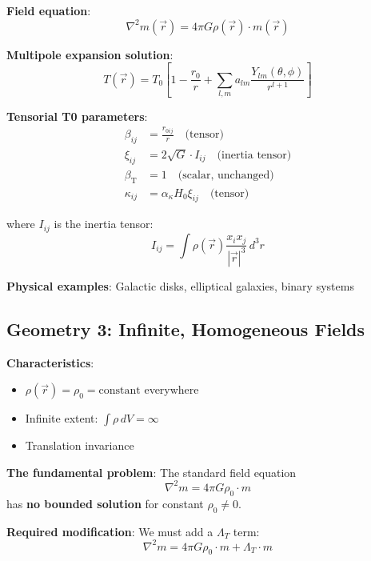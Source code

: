 \documentclass[12pt,a4paper]{article}
\newcommand{\betaT}{\beta_{\text{T}}}
\begin{document}
	\textbf{Field equation}:
	\begin{equation}
		\nabla^2 m(\vec{r}) = 4\pi G \rho(\vec{r}) \cdot m(\vec{r})
	\end{equation}
	
	\textbf{Multipole expansion solution}:
	\begin{equation}
		T(\vec{r}) = T_0\left[1 - \frac{r_0}{r} + \sum_{l,m} a_{lm} \frac{Y_{lm}(\theta,\phi)}{r^{l+1}}\right]
	\end{equation}
	
	\textbf{Tensorial T0 parameters}:
	\begin{align}
		\beta_{ij} &= \frac{r_{0ij}}{r} \quad \text{(tensor)} \\
		\xi_{ij} &= 2\sqrt{G} \cdot I_{ij} \quad \text{(inertia tensor)} \\
		\betaT &= 1 \quad \text{(scalar, unchanged)} \\
		\kappa_{ij} &= \alpha_\kappa H_0 \xi_{ij} \quad \text{(tensor)}
	\end{align}
	
	where $I_{ij}$ is the inertia tensor:
	\begin{equation}
		I_{ij} = \int \rho(\vec{r}) \frac{x_i x_j}{|\vec{r}|^3} \, d^3r
	\end{equation}
	
	\textbf{Physical examples}: Galactic disks, elliptical galaxies, binary systems
	
	\subsection{Geometry 3: Infinite, Homogeneous Fields}
	\label{subsec:geometry_infinite}
	
	\textbf{Characteristics}:
	\begin{itemize}
		\item $\rho(\vec{r}) = \rho_0 = \text{constant}$ everywhere
		\item Infinite extent: $\int \rho \, dV = \infty$
		\item Translation invariance
	\end{itemize}
	
	\textbf{The fundamental problem}: The standard field equation
	\begin{equation}
		\nabla^2 m = 4\pi G \rho_0 \cdot m
	\end{equation}
	has \textbf{no bounded solution} for constant $\rho_0 \neq 0$.
	
	\textbf{Required modification}: We must add a $\Lambda_T$ term:
	\begin{equation}
		\boxed{\nabla^2 m = 4\pi G \rho_0 \cdot m + \Lambda_T \cdot m}
	\end{equation}
	
\end{document}
